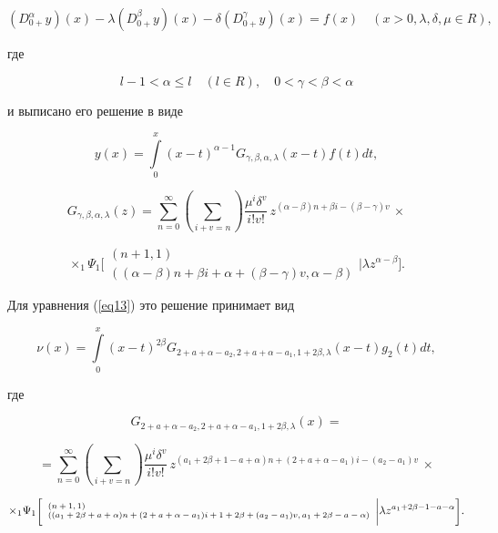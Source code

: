 \[

(D_{0+}^{\alpha} y)(x) - \lambda (D_{0+}^{\beta} y)(x) - \delta (D_{0+}^{\gamma} y)(x)=f(x) \quad (x>0, \lambda, \delta, \mu \in R),

\]

где

\[

l-1< \alpha \leqslant l \quad (l \in R), \quad 0< \gamma < \beta< \alpha

\]

и выписано его решение в виде

\[

y(x) =\int\limits_{0}^{x} (x-t)^{\alpha-1} G_{\gamma, \beta, \alpha, \lambda} (x-t)f(t)dt,

\]

\[

G_{\gamma, \beta, \alpha, \lambda} (z)= \sum_{n=0}^{\infty} \left( \sum_{i+v=n}\right)  \frac{\mu^{i} \delta^{v}}{i! v!}\, z^{(\alpha-\beta) n+ \beta i-(\beta-\gamma)v} \, \times

\]

\[

\times _{1}\Psi_{1}    \Biggr[ {\begin {array}{l}  (n+1,1) \\ ((\alpha-\beta) n + \beta i +\alpha+(\beta-\gamma)v, \alpha -\beta)  \end{array}} \Biggr| \lambda z^{\alpha-\beta}  \Biggr].

\]



Для уравнения (\ref{eq13}) это решение принимает вид

\[

\nu(x)=\int\limits_{0}^{x} (x-t)^{2\beta} G_{2+a+\alpha-a_{2}, 2+a+\alpha-a_{1}, 1+2\beta, \lambda}(x-t)g_{2}(t)dt,

\]

где

\[

G_{2+a+\alpha-a_{2}, 2+a+\alpha-a_{1}, 1+2\beta, \lambda} (x)=

\]

\[

= \sum_{n=0}^{\infty} \left( \sum_{i+v=n} \right) \frac{\mu^{i} \delta^{v}}{i! v!}\, z^{(a_{1}+2\beta+1-a+\alpha) n+ (2+a+\alpha-a_{1})i-(a_{2}-a_{1})v} \, \times

\]

\[

\scriptsize   {\times _{1}\Psi_{1}    \Biggr[ {\begin {array}{l}  (n+1,1) \\ ((a_{1}+2\beta+a+\alpha) n + (2+a+\alpha-a_{1}) i + 1+2\beta +(a_{2}-a_{1})v, a_{1}+2\beta-a-\alpha)  \end{array}} \Biggr| \lambda z^{a_{1}+2\beta-1-a-\alpha}  \Biggr].}

\]



